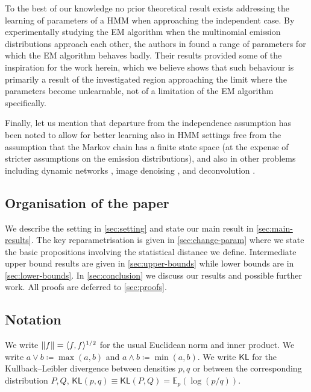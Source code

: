 \documentclass[journal]{IEEEtran}
\newcommand{\1}{\boldsymbol{1}}
\newcommand{\EE}{\mathbb{E}}
\newcommand{\KL}{\mathsf{KL}}
\DeclarePairedDelimiter{\ip}{\langle}{\rangle}
\DeclarePairedDelimiter{\norm}{\lVert}{\rVert}
\begin{document}
	To the best of our knowledge no prior theoretical result exists addressing the learning of parameters of a HMM when approaching the independent case.
	By experimentally studying the EM algorithm when the multinomial emission distributions approach each other, the authors in \cite{Phys:2020} found a range of parameters for which the EM algorithm behaves badly. Their results provided some of the inspiration for the work herein, which we believe shows that such behaviour is primarily
a result of the investigated region approaching the limit where the parameters become unlearnable, not of a limitation of the EM algorithm specifically. %


	Finally, let us mention that departure from the independence assumption has been noted to allow for better learning also in HMM settings free from the assumption that the Markov chain has a finite state space \cite{MR4119183, MR3433429} (at the expense of stricter assumptions on the emission distributions), and also in other problems including dynamic networks \cite{MR3689311, MR3964859},
	image denoising \cite{Ollion:2021}, and deconvolution \cite{gassiat:lecorff:lehericy:2020}.



	\subsection{Organisation of the paper}

We describe the setting in \cref{sec:setting} and state our main result in \cref{sec:main-results}. The key reparametrisation is given in \cref{sec:change-param} where we state  the basic propositions involving the statistical distance we define. Intermediate upper bound results are given in \cref{sec:upper-bounds} while lower bounds are in \cref{sec:lower-bounds}.
In \cref{sec:conclusion} we discuss our results and possible further work.
All proofs are deferred to \cref{sec:proofs}.

\subsection{Notation}
We write $\norm{f}=\ip{f,f}^{1/2}$  for the usual Euclidean norm and inner product. We write $a\vee b\coloneqq \max(a,b)$ and $a\wedge b\coloneqq \min(a,b)$. We write
$\KL$ for the Kullback--Leibler divergence between densities $p,q$ or between the corresponding distribution $P,Q$, $\KL(p,q)\equiv \KL(P,Q) = \EE_p(\log(p/q))$.
\end{document}
